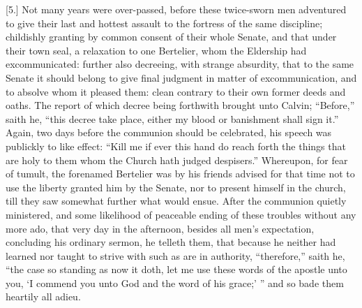 [5.] Not many years were over-passed, before these twice-sworn men adventured to give their last and hottest assault to the fortress of the same discipline; childishly granting by common consent of their whole Senate, and that under their town seal, a relaxation to one Bertelier, whom the Eldership had excommunicated: further also decreeing, with strange absurdity, that to the same Senate it should belong to give final judgment in matter of excommunication, and to absolve whom it pleased them: clean contrary to their own former deeds and oaths. The report of which decree being forthwith brought unto Calvin; “Before,” saith he, “this decree take place, either my blood or banishment shall sign it.” Again, two days before the communion should be celebrated, his speech was publickly to like effect: “Kill me if ever this hand do reach forth the things that are holy to them whom the Church hath judged despisers.” Whereupon, for fear of tumult, the forenamed Bertelier was by his friends advised for that time not to use the liberty granted him by the Senate, nor to present himself in the church, till they saw somewhat further what would ensue. After the communion quietly ministered, and some likelihood of peaceable ending of these troubles without any more ado, that very day in the afternoon, besides all men’s expectation, concluding his ordinary sermon, he telleth them, that because he neither had learned nor taught to strive with such as are in authority, “therefore,” saith he, “the case so standing as now it doth, let me use these words of the apostle unto you, ‘I commend you unto God and the word of his grace;’ ” and so bade them heartily all adieu.


